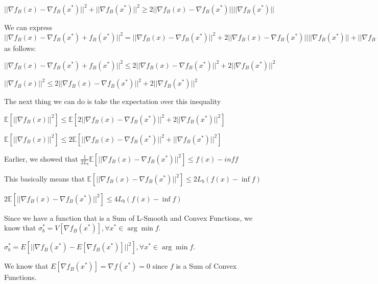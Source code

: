 $||\nabla f_B(x) - \nabla f_B(x^*)||^2  + ||\nabla f_B(x^*)||^2 \geq 2 ||\nabla f_B(x) - \nabla f_B(x^*)|| ||\nabla f_B(x^*)||$ \newline 

We can express $||\nabla f_B(x) - \nabla f_B(x^*) + f_B(x^*)||^2 = ||\nabla f_B(x) - \nabla f_B(x^*)||^2 + 2 ||\nabla f_B(x) - \nabla f_B(x^*)|| ||\nabla f_B(x^*)|| + ||\nabla f_B(x^*)||^2$  as follows: \newline 

$||\nabla f_B(x) - \nabla f_B(x^*) + f_B(x^*)||^2 \leq 2||\nabla f_B(x) - \nabla f_B(x^*)||^2 + 2||\nabla f_B(x^*)||^2$ \newline 

$||\nabla f_B(x)||^2 \leq 2||\nabla f_B(x) - \nabla f_B(x^*)||^2 + 2||\nabla f_B(x^*)||^2$ \newline 

The next thing we can do is take the expectation over this inequality \newline

\noindent $\mathbb{E}[||\nabla f_B(x)||^2] \leq \mathbb{E} [2||\nabla f_B(x) - \nabla f_B(x^*)||^2 + 2||\nabla f_B(x^*)||^2]$ \newline 

$\mathbb{E}[||\nabla f_B(x)||^2] \leq 2\mathbb{E} [||\nabla f_B(x) - \nabla f_B(x^*)||^2 + ||\nabla f_B(x^*)||^2]$ \newline 

Earlier, we showed that $\frac{1}{2L_{b}} \mathbb{E}[||\nabla f_B(x) - \nabla f_B(x^*)||^2] \leq f(x) - inf f$ \newline 

This basically means that $\mathbb{E}[||\nabla f_B(x) - \nabla f_B(x^*)||^2] \leq 2L_b (f(x) - \inf f)$ \newline 

$2\mathbb{E}[||\nabla f_B(x) - \nabla f_B(x^*)||^2] \leq 4L_b (f(x) - \inf f)$

Since we have a function that is a Sum of L-Smooth and Convex Functions, we know that \newline 
\noindent $\sigma_b^* = V[\nabla f_B(x^*)], \forall x^* \in \arg \min f.$ \newline 

\noindent $\sigma_b^* = E[||\nabla f_B(x^*) - E[\nabla f_B(x^*)]||^2], \forall x^* \in \arg \min f.$ \newline 

We know that $E[\nabla f_B(x^*)] = \nabla f(x^*) = 0$ since $f$ is a Sum of Convex Functions. \newline 

